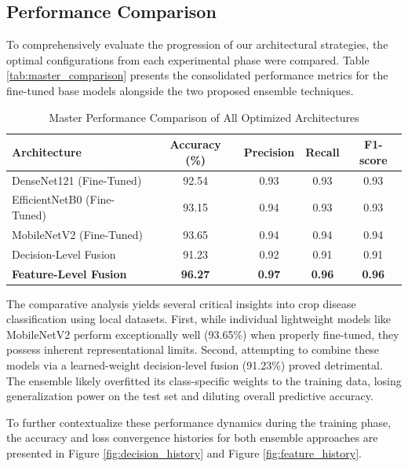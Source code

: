 \subsection{Performance Comparison}

To comprehensively evaluate the progression of our architectural strategies, the optimal configurations from each experimental phase were compared. Table \ref{tab:master_comparison} presents the consolidated performance metrics for the fine-tuned base models alongside the two proposed ensemble techniques.

\begin{table}[H]
\centering

\label{tab:model_comparison}
\renewcommand{\arraystretch}{1.2}
\begin{tabular}{lcccc}
\hline
\textbf{Architecture} & \textbf{Accuracy (\%)} & \textbf{Precision} & \textbf{Recall} & \textbf{F1-score} \\
\hline
DenseNet121 (Fine-Tuned)    & 92.54 & 0.93 & 0.93 & 0.93 \\
EfficientNetB0 (Fine-Tuned) & 93.15 & 0.94 & 0.93 & 0.93 \\
MobileNetV2 (Fine-Tuned)    & 93.65 & 0.94 & 0.94 & 0.94 \\
Decision-Level Fusion       & 91.23 & 0.92 & 0.91 & 0.91 \\
\textbf{Feature-Level Fusion} & \textbf{96.27} & \textbf{0.97} & \textbf{0.96} & \textbf{0.96} \\
\hline
\end{tabular}
\caption{Master Performance Comparison of All Optimized Architectures}
\end{table}

The comparative analysis yields several critical insights into crop disease classification using local datasets. First, while individual lightweight models like MobileNetV2 perform exceptionally well (93.65\%) when properly fine-tuned, they possess inherent representational limits. Second, attempting to combine these models via a learned-weight decision-level fusion (91.23\%) proved detrimental. The ensemble likely overfitted its class-specific weights to the training data, losing generalization power on the test set and diluting overall predictive accuracy. 

To further contextualize these performance dynamics during the training phase, the accuracy and loss convergence histories for both ensemble approaches are presented in Figure \ref{fig:decision_history} and Figure \ref{fig:feature_history}.

